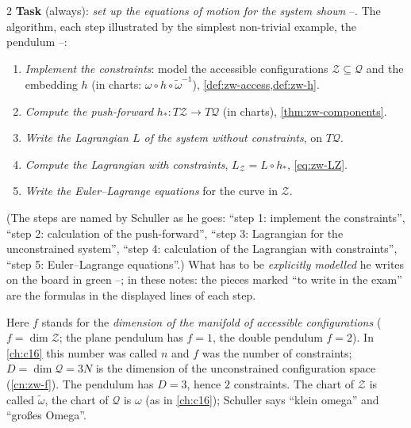 \begin{paracol}{2}
\textbf{Task} (always): \emph{set up the equations of motion for the system shown} --. The algorithm, each step illustrated by the simplest non-trivial example, the pendulum --:

\begin{definition}\label{def:pc-algorithm}
\begin{enumerate}
  \item \emph{Implement the constraints}: model the accessible configurations $\mathcal Z\subseteq\mathcal Q$ and the embedding $h$ (in charts: $\omega\circ h\circ\tilde\omega^{-1}$), \cref{def:zw-access,def:zw-h}.
  \item \emph{Compute the push-forward} $h_*\colon T\mathcal Z\to T\mathcal Q$ (in charts), \cref{thm:zw-components}.
  \item \emph{Write the Lagrangian $L$ of the system without constraints}, on $T\mathcal Q$.
  \item \emph{Compute the Lagrangian with constraints}, $L_{\mathcal Z}=L\circ h_*$, \eqref{eq:zw-LZ}.
  \item \emph{Write the Euler--Lagrange equations} for the curve in $\mathcal Z$.
\end{enumerate}
\end{definition}
(The steps are named by Schuller as he goes: ``step 1: implement the constraints'', ``step 2: calculation of the push-forward'', ``step 3: Lagrangian for the unconstrained system'', ``step 4: calculation of the Lagrangian with constraints'', ``step 5: Euler--Lagrange equations''.) What has to be \emph{explicitly modelled} he writes on the board in green --; in these notes: the pieces marked ``to write in the exam'' are the formulas in the displayed lines of each step.

\begin{coursenote}\label{cn:pc-f}
Here $f$ stands for the \emph{dimension of the manifold of accessible configurations} ($f=\dim\mathcal Z$; the plane pendulum has $f=1$, the double pendulum $f=2$). In \cref{ch:c16} this number was called $n$ and $f$ was the number of constraints; $D=\dim\mathcal Q=3N$ is the dimension of the unconstrained configuration space (\cref{cn:zw-f}). The pendulum has $D=3$, hence $2$ constraints. The chart of $\mathcal Z$ is called $\tilde\omega$, the chart of $\mathcal Q$ is $\omega$ (as in \cref{ch:c16}); Schuller says ``klein omega'' and ``gro{\ss}es Omega''.
\end{coursenote}


\end{paracol}
